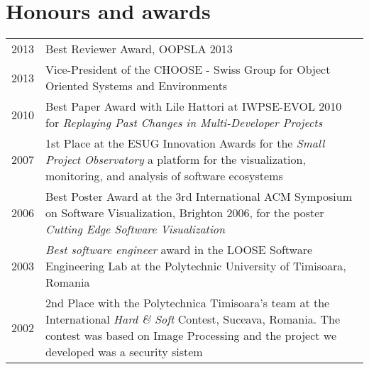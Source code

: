 \section{Honours and awards}
\begin{tabular}{p{1cm}p{12cm}}

2013 & Best Reviewer Award, OOPSLA 2013 \\

2013 & Vice-President of the CHOOSE - Swiss Group for Object Oriented Systems and Environments \\
2010 & Best Paper Award with Lile Hattori at IWPSE-EVOL 2010 for {\em Replaying Past Changes in Multi-Developer Projects}\\

2007 & 1st Place at the ESUG Innovation Awards for the {\em Small Project Observatory} a platform for the visualization, monitoring, and analysis of software ecosystems\\

2006 & Best Poster Award at the 3rd International ACM Symposium on Software Visualization, Brighton 2006, for the poster {\em Cutting Edge Software Visualization} \\

2003 & {\em Best software engineer} award in the LOOSE Software Engineering Lab at the Polytechnic University of Timisoara, Romania \\

2002 & 2nd Place with the Polytechnica Timisoara's team at the International {\em Hard \& Soft} Contest, Suceava, Romania. The contest was based on Image Processing and the project we developed was a security sistem \\

%
\end{tabular}
